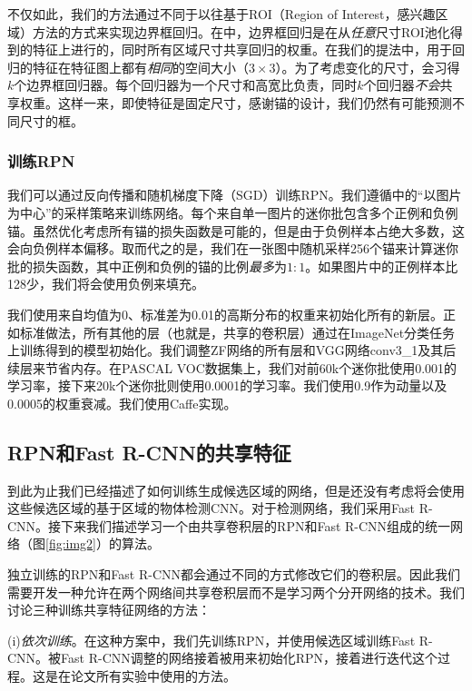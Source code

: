\documentclass[../main.tex]{subfile}
\begin{document}
不仅如此，我们的方法通过不同于以往基于ROI（Region of Interest，感兴趣区域）方法的方式\cite{spp, fastrcnn}来实现边界框回归。在\cite{spp, fastrcnn}中，边界框回归是在从\textit{任意}尺寸ROI池化得到的特征上进行的，同时所有区域尺寸共享回归的权重。在我们的提法中，用于回归的特征在特征图上都有\textit{相同}的空间大小（$3\times 3$）。为了考虑变化的尺寸，会习得$k$个边界框回归器。每个回归器为一个尺寸和高宽比负责，同时$k$个回归器\textit{不会}共享权重。这样一来，即使特征是固定尺寸，感谢锚的设计，我们仍然有可能预测不同尺寸的框。

\subsubsection{训练RPN}

我们可以通过反向传播和随机梯度下降（SGD）训练RPN。我们遵循\cite{fastrcnn}中的“以图片为中心”的采样策略来训练网络。每个来自单一图片的迷你批包含多个正例和负例锚。虽然优化考虑所有锚的损失函数是可能的，但是由于负例样本占绝大多数，这会向负例样本偏移。取而代之的是，我们在一张图中随机采样256个锚来计算迷你批的损失函数，其中正例和负例的锚的比例\textit{最多}为$1:1$。如果图片中的正例样本比128少，我们将会使用负例来填充。

我们使用来自均值为0、标准差为0.01的高斯分布的权重来初始化所有的新层。正如标准做法\cite{rcnn}，所有其他的层（也就是，共享的卷积层）通过在ImageNet分类任务上训练得到的模型初始化。我们调整ZF网络的所有层和VGG网络conv3\_1及其后续层来节省内存\cite{fastrcnn}。在PASCAL VOC数据集上，我们对前60k个迷你批使用0.001的学习率，接下来20k个迷你批则使用0.0001的学习率。我们使用0.9作为动量以及0.0005的权重衰减\cite{alexnet}。我们使用Caffe实现。

\subsection{RPN和Fast R-CNN的共享特征}

到此为止我们已经描述了如何训练生成候选区域的网络，但是还没有考虑将会使用这些候选区域的基于区域的物体检测CNN。对于检测网络，我们采用Fast R-CNN\cite{fastrcnn}。接下来我们描述学习一个由共享卷积层的RPN和Fast R-CNN组成的统一网络（图\ref{fig:img2}）的算法。

独立训练的RPN和Fast R-CNN都会通过不同的方式修改它们的卷积层。因此我们需要开发一种允许在两个网络间共享卷积层而不是学习两个分开网络的技术。我们讨论三种训练共享特征网络的方法：

(i)\textit{依次训练}。在这种方案中，我们先训练RPN，并使用候选区域训练Fast R-CNN。被Fast R-CNN调整的网络接着被用来初始化RPN，接着进行迭代这个过程。这是在论文所有实验中使用的方法。
\end{document}
